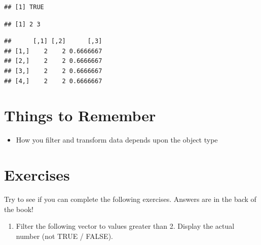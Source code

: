 \documentclass[
]{book}
\newenvironment{Shaded}{\begin{snugshade}}{\end{snugshade}}
\newcommand{\DecValTok}[1]{\textcolor[rgb]{0.00,0.00,0.81}{#1}}
\newcommand{\NormalTok}[1]{#1}
\newcommand{\OperatorTok}[1]{\textcolor[rgb]{0.81,0.36,0.00}{\textbf{#1}}}
\providecommand{\tightlist}{%
  \setlength{\itemsep}{0pt}\setlength{\parskip}{0pt}}
\begin{document}
\begin{center}
\begin{verbatim}
## [1] TRUE
\end{verbatim}

\begin{Shaded}
\end{Shaded}

\begin{verbatim}
## [1] 2 3
\end{verbatim}

\begin{Shaded}
\end{Shaded}

\begin{verbatim}
##      [,1] [,2]      [,3]
## [1,]    2    2 0.6666667
## [2,]    2    2 0.6666667
## [3,]    2    2 0.6666667
## [4,]    2    2 0.6666667
\end{verbatim}

\hypertarget{things-to-remember-3}{%
\section{Things to Remember}\label{things-to-remember-3}}

\begin{itemize}
\tightlist
\item
  How you filter and transform data depends upon the object type
\end{itemize}

\hypertarget{exercises}{%
\section{Exercises}\label{exercises}}

Try to see if you can complete the following exercises. Answers are in the back of the book!

\begin{enumerate}
\def\labelenumi{\arabic{enumi}.}
\tightlist
\item
  Filter the following vector to values greater than 2. Display the actual number (not TRUE / FALSE).
\end{enumerate}


\end{center}
\end{document}
